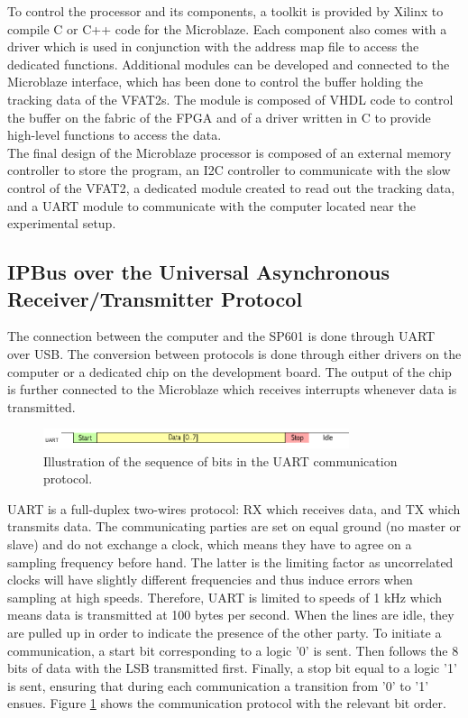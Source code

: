       To control the processor and its components, a toolkit is provided by Xilinx to compile C or C++ code for the Microblaze. Each component also comes with a driver which is used in conjunction with the address map file to access the dedicated functions. Additional modules can be developed and connected to the Microblaze interface, which has been done to control the buffer holding the tracking data of the VFAT2s. The module is composed of VHDL code to control the buffer on the fabric of the FPGA and of a driver written in C to provide high-level functions to access the data. \\

      The final design of the Microblaze processor is composed of an external memory controller to store the program, an I2C controller to communicate with the slow control of the VFAT2, a dedicated module created to read out the tracking data, and a UART module to communicate with the computer located near the experimental setup.

    \subsection{IPBus over the Universal Asynchronous Receiver/Transmitter Protocol}

      The connection between the computer and the SP601 is done through UART over USB. The conversion between protocols is done through either drivers on the computer or a dedicated chip on the development board. The output of the chip is further connected to the Microblaze which receives interrupts whenever data is transmitted. \\

      \begin{figure}[b!]
        \centering
        \includegraphics[width=0.8\textwidth]{img/III-1-arch/uart.png}
        \caption{Illustration of the sequence of bits in the UART communication protocol.}
        \label{fig:III-1-uart}
      \end{figure}

      UART is a full-duplex two-wires protocol: RX which receives data, and TX which transmits data. The communicating parties are set on equal ground (no master or slave) and do not exchange a clock, which means they have to agree on a sampling frequency before hand. The latter is the limiting factor as uncorrelated clocks will have slightly different frequencies and thus induce errors when sampling at high speeds. Therefore, UART is limited to speeds of 1 kHz which means data is transmitted at 100 bytes per second. When the lines are idle, they are pulled up in order to indicate the presence of the other party. To initiate a communication, a start bit corresponding to a logic '0' is sent. Then follows the 8 bits of data with the LSB transmitted first. Finally, a stop bit equal to a logic '1' is sent, ensuring that during each communication a transition from '0' to '1' ensues. Figure \ref{fig:III-1-uart} shows the communication protocol with the relevant bit order. \\

